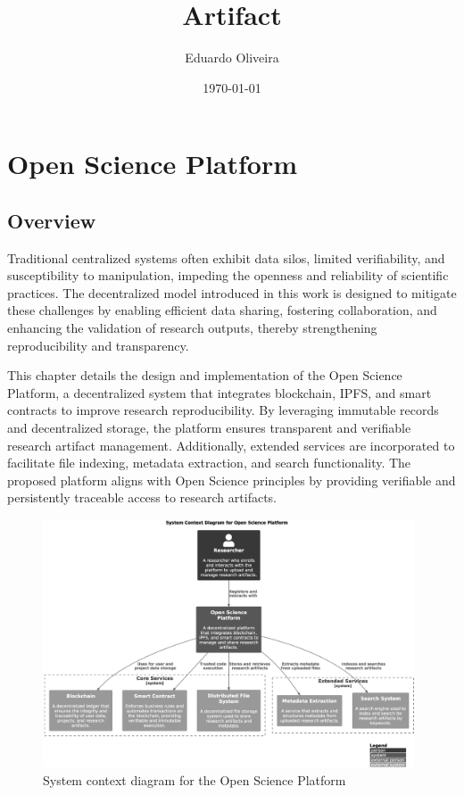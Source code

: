 \documentclass{article}
\title{Artifact}
\author{Eduardo Oliveira}
\date{\today}
\begin{document}
\maketitle

\section{Open Science Platform}

\subsection{Overview}

Traditional centralized systems often exhibit data silos, limited verifiability, and susceptibility to manipulation, impeding the openness and reliability of scientific practices. The decentralized model introduced in this work is designed to mitigate these challenges by enabling efficient data sharing, fostering collaboration, and enhancing the validation of research outputs, thereby strengthening reproducibility and transparency.

This chapter details the design and implementation of the Open Science Platform, a decentralized system that integrates blockchain, IPFS, and smart contracts to improve research reproducibility. By leveraging immutable records and decentralized storage, the platform ensures transparent and verifiable research artifact management. Additionally, extended services are incorporated to facilitate file indexing, metadata extraction, and search functionality. The proposed platform aligns with Open Science principles by providing verifiable and persistently traceable access to research artifacts.


\begin{figure}[htbp]
      \centering
      \includegraphics[width=0.98\textwidth, keepaspectratio]{c4_context_diagram}
      \caption{System context diagram for the Open Science Platform}
      \label{fig:c4_context_diagram}
\end{figure}
\end{document}
